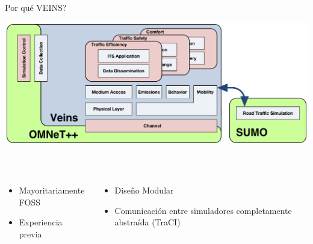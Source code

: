 \documentclass[aspectratio=169]{beamer}
\begin{document}
\begin{frame}{Por qué VEINS?}
\vspace{\belowdisplayskip}
\begin{minipage}{\linewidth}
    \centering
    \includegraphics[width=.8\linewidth]{figuras/veins-arch.png}
\end{minipage}\\
\vspace{\belowdisplayskip}\pause
\begin{minipage}{\linewidth}
    \begin{columns}
        \begin{column}{.5\linewidth}
            \begin{itemize}
                \item Mayoritariamente FOSS\pause
                \item Experiencia previa\pause
            \end{itemize}
        \end{column}
        \begin{column}{.5\linewidth}
            \begin{itemize}
                \item Diseño Modular\pause
                \item Comunicación entre simuladores completamente abstraída (TraCI)
            \end{itemize}
        \end{column}
    \end{columns}
\end{minipage}
\end{frame}
\end{document}
